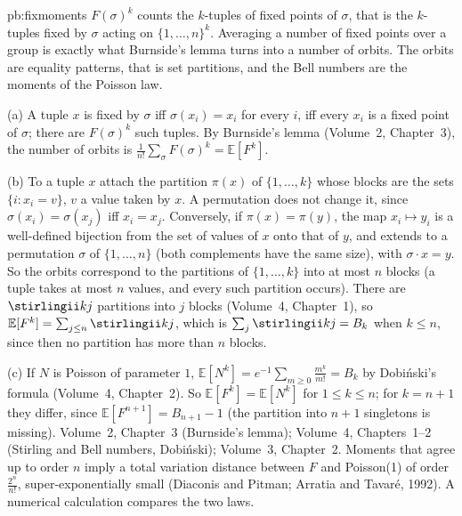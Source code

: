 \begin{solution}{pb:fixmoments}
\idea $F(\sigma)^k$ counts the $k$-tuples of fixed points of $\sigma$, that is the $k$-tuples fixed by $\sigma$ acting on
$\{1,\dots,n\}^k$. Averaging a number of fixed points over a group is exactly what Burnside's lemma turns into a number of
orbits. The orbits are equality patterns, that is set partitions, and the Bell numbers are the moments of the Poisson law.

\writeup (a) A tuple $x$ is fixed by $\sigma$ iff $\sigma(x_i)=x_i$ for every $i$, iff every $x_i$ is a fixed point of
$\sigma$; there are $F(\sigma)^k$ such tuples. By Burnside's lemma (Volume~2, Chapter~3), the number of orbits is
$\frac1{n!}\sum_\sigma F(\sigma)^k=\mathbb E[F^k]$.

(b) To a tuple $x$ attach the partition $\pi(x)$ of $\{1,\dots,k\}$ whose blocks are the sets $\{i:x_i=v\}$, $v$ a value taken
by $x$. A permutation does not change it, since $\sigma(x_i)=\sigma(x_j)$ iff $x_i=x_j$. Conversely, if $\pi(x)=\pi(y)$, the map
$x_i\mapsto y_i$ is a well-defined bijection from the set of values of $x$ onto that of $y$, and extends to a permutation
$\sigma$ of $\{1,\dots,n\}$ (both complements have the same size), with $\sigma\cdot x=y$. So the orbits correspond to the
partitions of $\{1,\dots,k\}$ into at most $n$ blocks (a tuple takes at most $n$ values, and every such partition occurs).
There are $\stirlingii kj$ partitions into $j$ blocks (Volume~4, Chapter~1), so $\mathbb E[F^k]=\sum_{j\le n}\stirlingii kj$,
which is $\sum_j\stirlingii kj=B_k$ when $k\le n$, since then no partition has more than $n$ blocks.

(c) If $N$ is Poisson of parameter $1$, $\mathbb E[N^k]=e^{-1}\sum_{m\ge0}\frac{m^k}{m!}=B_k$ by Dobiński's formula (Volume~4,
Chapter~2). So $\mathbb E[F^k]=\mathbb E[N^k]$ for $1\le k\le n$; for $k=n+1$ they differ, since $\mathbb E[F^{n+1}]=B_{n+1}-1$
(the partition into $n+1$ singletons is missing).
\tools Volume~2, Chapter~3 (Burnside's lemma); Volume~4, Chapters~1--2 (Stirling and Bell numbers, Dobiński); Volume~3, Chapter~2.
\leads Moments that agree up to order $n$ imply a total variation distance between $F$ and Poisson(1) of order
$\frac{2^n}{n!}$, super-exponentially small (Diaconis and Pitman; Arratia and Tavaré, 1992). A numerical calculation compares the two laws.
\end{solution}

